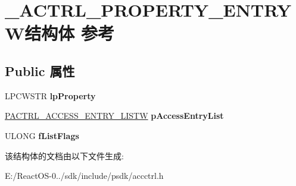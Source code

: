 \hypertarget{struct___a_c_t_r_l___p_r_o_p_e_r_t_y___e_n_t_r_y_w}{}\section{\+\_\+\+A\+C\+T\+R\+L\+\_\+\+P\+R\+O\+P\+E\+R\+T\+Y\+\_\+\+E\+N\+T\+R\+Y\+W结构体 参考}
\label{struct___a_c_t_r_l___p_r_o_p_e_r_t_y___e_n_t_r_y_w}
\subsection*{Public 属性}
\begin{DoxyCompactItemize}
\item 
\mbox{\label{struct___a_c_t_r_l___p_r_o_p_e_r_t_y___e_n_t_r_y_w_a7e58d2cdf865c119dbcf5655e11be0f9}} 
L\+P\+C\+W\+S\+TR {\bfseries lp\+Property}
\item 
\mbox{\label{struct___a_c_t_r_l___p_r_o_p_e_r_t_y___e_n_t_r_y_w_af211b82c9d4bc4d3a02eb8c70402cfb2}} 
\hyperlink{struct___a_c_t_r_l___a_c_c_e_s_s___e_n_t_r_y___l_i_s_t_w}{P\+A\+C\+T\+R\+L\+\_\+\+A\+C\+C\+E\+S\+S\+\_\+\+E\+N\+T\+R\+Y\+\_\+\+L\+I\+S\+TW} {\bfseries p\+Access\+Entry\+List}
\item 
\mbox{\label{struct___a_c_t_r_l___p_r_o_p_e_r_t_y___e_n_t_r_y_w_a2f9030a78b141d7247846fba50ee86e1}} 
U\+L\+O\+NG {\bfseries f\+List\+Flags}
\end{DoxyCompactItemize}


该结构体的文档由以下文件生成\+:\begin{DoxyCompactItemize}
\item 
E\+:/\+React\+O\+S-\/0../sdk/include/psdk/accctrl.\+h\end{DoxyCompactItemize}
